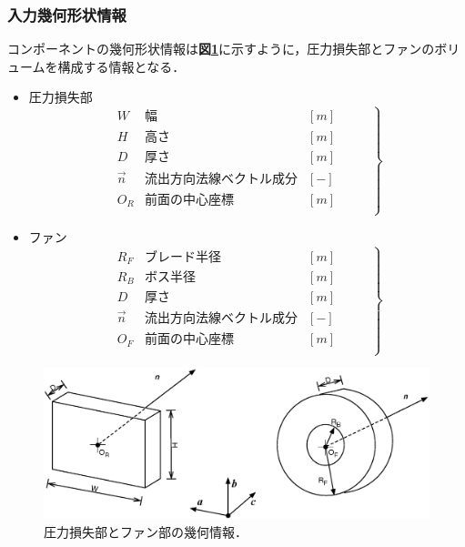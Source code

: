\subsubsection{入力幾何形状情報}
コンポーネントの幾何形状情報は\textbf{図\ref{fig:geometry_info}}に示すように，圧力損失部とファンのボリュームを構成する情報となる．
\begin{itemize}
\item 圧力損失部
{\small
\begin{equation}
\left.
\begin{array}{lll}
W  & 幅  &  [m] \\
H  & 高さ  & [m] \\
D  & 厚さ  & [m] \\
\overrightarrow{n} & 流出方向法線ベクトル成分 & [-] \\
O_R & 前面の中心座標 & [m] \\
\end{array} \hspace{1cm} \right\}
\end{equation}
}

\item ファン
{\small
\begin{equation}
\left.
\begin{array}{lll}
R_F  & ブレード半径  &  [m] \\
R_B  & ボス半径  & [m] \\
D  & 厚さ  & [m] \\
\overrightarrow{n} & 流出方向法線ベクトル成分 & [-] \\
O_F & 前面の中心座標 & [m] \\
\end{array} \hspace{1cm} \right\}
\end{equation}
}

\end{itemize}


\begin{figure}[htbp]
\begin{center}
\includegraphics[width=12cm,clip]{compo_dim.eps}
\end{center}
\caption{圧力損失部とファン部の幾何情報．}
\label{fig:geometry_info}
\end{figure}

